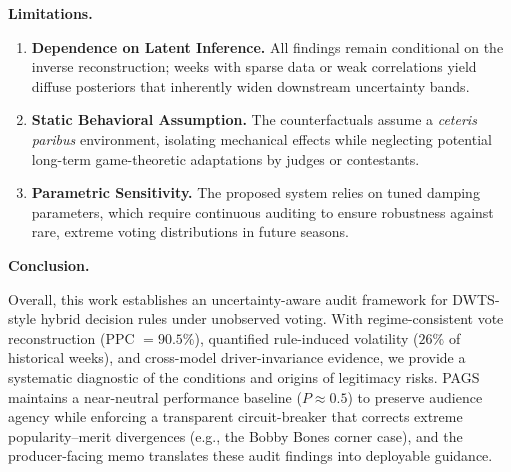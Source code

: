 \noindent\textbf{Limitations.}
\begin{enumerate}
    \setlength{\itemsep}{0pt}
    \setlength{\parskip}{0pt}
    \setlength{\parsep}{0pt}

    \item \textbf{Dependence on Latent Inference.} 
    All findings remain conditional on the inverse reconstruction; weeks with sparse data or weak correlations yield diffuse posteriors that inherently widen downstream uncertainty bands.

    \item \textbf{Static Behavioral Assumption.} 
    The counterfactuals assume a \textit{ceteris paribus} environment, isolating mechanical effects while neglecting potential long-term game-theoretic adaptations by judges or contestants.

    \item \textbf{Parametric Sensitivity.} 
    The proposed system relies on tuned damping parameters, which require continuous auditing to ensure robustness against rare, extreme voting distributions in future seasons.
\end{enumerate}
\vspace{1ex}
\noindent\textbf{Conclusion.}  

Overall, this work establishes an uncertainty-aware audit framework for DWTS-style hybrid decision rules under unobserved voting. With regime-consistent vote reconstruction (PPC $=90.5\%$), quantified rule-induced volatility ($26\%$ of historical weeks), and cross-model driver-invariance evidence, we provide a systematic diagnostic of the conditions and origins of legitimacy risks. PAGS maintains a near-neutral performance baseline ($P \approx 0.5$) to preserve audience agency while enforcing a transparent circuit-breaker that corrects extreme popularity--merit divergences (e.g., the Bobby Bones corner case), and the producer-facing memo translates these audit findings into deployable guidance.


\endgroup